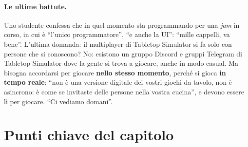 \paragraph{Le ultime battute.} Uno studente confessa che in quel momento sta
programmando per una \emph{jam} in corso, in cui è ``l'unico programmatore'', ``e
anche la UI'': ``mille cappelli, va bene''. L'ultima domanda: il multiplayer di
Tabletop Simulator si fa solo con persone che si conoscono? No: esistono un gruppo
Discord e gruppi Telegram di Tabletop Simulator dove la gente si trova a giocare, anche
in modo casual. Ma bisogna accordarsi per giocare \textbf{nello stesso momento},
perché si gioca \textbf{in tempo reale}: ``non è una versione digitale dei vostri
giochi da tavolo, non è asincrono: è come se invitaste delle persone nella vostra
cucina'', e devono essere lì per giocare. ``Ci vediamo domani''.

\section*{Punti chiave del capitolo}

